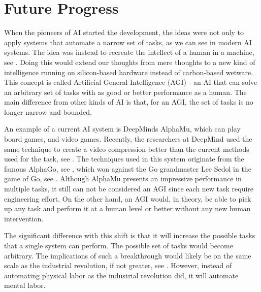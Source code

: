 \documentclass[12pt,A4]{report}
\theoremstyle{definition}
\begin{document}


\section{Future Progress}
When the pioneers of AI started the development, the ideas were not only to apply systems that automate a narrow set of tasks, as we can see in modern AI systems. The idea was instead to recreate the intellect of a human in a machine, see \citet{Dartmouth}. Doing this would extend our thoughts from mere thoughts to a new kind of intelligence running on silicon-based hardware instead of carbon-based wetware. This concept is called Artificial General Intelligence (AGI) - an AI that can solve an arbitrary set of tasks with as good or better performance as a human. The main difference from other kinds of AI is that, for an AGI, the set of tasks is no longer narrow and bounded. 



An example of a current AI system is DeepMinds AlphaMu, which can play board games, and video games. Recently, the researchers at DeepMind used the same technique to create a video compression better than the current methods used for the task, see \citet{Mandhane}. The techniques used in this system originate from the famous AlphaGo, see \citet{Silver}, which won against the Go grandmaster Lee Sedol in the game of Go, see \citet{DeepMind}. Although AlphaMu presents an impressive performance in multiple tasks, it still can not be considered an AGI since each new task require engineering effort. On the other hand, an AGI would, in theory, be able to pick up any task and perform it at a human level or better without any new human intervention.

The significant difference with this shift is that it will increase the possible tasks that a single system can perform. The possible set of tasks would become arbitrary. The implications of such a breakthrough would likely be on the same scale as the industrial revolution, if not greater, see \citet{CritchKruger}. However, instead of automating physical labor as the industrial revolution did, it will automate mental labor. 
\end{document}
